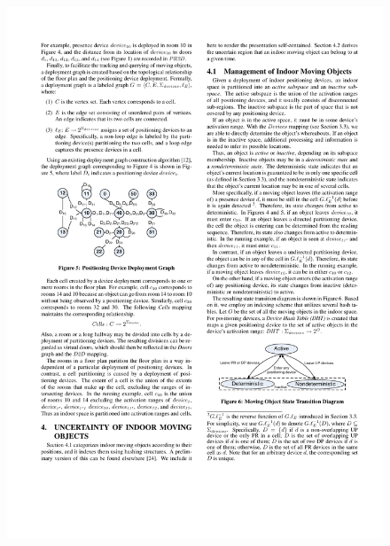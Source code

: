 \begin{frame}
\begin{columns}[c]
\begin{figure}[tb]
      \includegraphics[width=\columnwidth]{figures/2-3/2-3-5.pdf}
    \end{figure}

\end{columns}

\end{frame}



